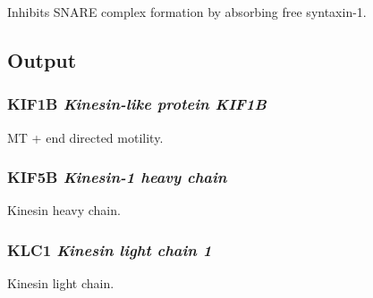 Inhibits SNARE complex formation by absorbing free syntaxin-1.

\subsection{Output}

\subsubsection{KIF1B \textit{Kinesin-like protein KIF1B}}

MT + end directed motility.

\subsubsection{KIF5B \textit{Kinesin-1 heavy chain}}

Kinesin heavy chain.

\subsubsection{KLC1 \textit{Kinesin light chain 1}}

Kinesin light chain.





